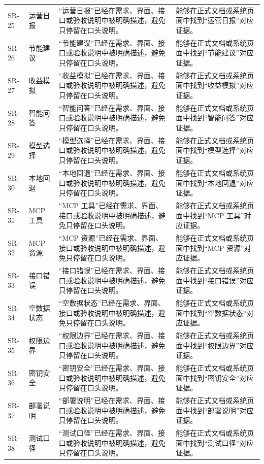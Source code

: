 \documentclass[12pt,a4paper]{ctexart}
\begin{document}
\begin{longtable}{L{1.7cm}L{3.0cm}L{6.2cm}L{4.4cm}}
SR-25 & 运营日报 & “运营日报”已经在需求、界面、接口或验收说明中被明确描述，避免只停留在口头说明。 & 能够在正式文档或系统页面中找到“运营日报”对应证据。 \\
SR-26 & 节能建议 & “节能建议”已经在需求、界面、接口或验收说明中被明确描述，避免只停留在口头说明。 & 能够在正式文档或系统页面中找到“节能建议”对应证据。 \\
SR-27 & 收益模拟 & “收益模拟”已经在需求、界面、接口或验收说明中被明确描述，避免只停留在口头说明。 & 能够在正式文档或系统页面中找到“收益模拟”对应证据。 \\
SR-28 & 智能问答 & “智能问答”已经在需求、界面、接口或验收说明中被明确描述，避免只停留在口头说明。 & 能够在正式文档或系统页面中找到“智能问答”对应证据。 \\
SR-29 & 模型选择 & “模型选择”已经在需求、界面、接口或验收说明中被明确描述，避免只停留在口头说明。 & 能够在正式文档或系统页面中找到“模型选择”对应证据。 \\
SR-30 & 本地回退 & “本地回退”已经在需求、界面、接口或验收说明中被明确描述，避免只停留在口头说明。 & 能够在正式文档或系统页面中找到“本地回退”对应证据。 \\
SR-31 & MCP 工具 & “MCP 工具”已经在需求、界面、接口或验收说明中被明确描述，避免只停留在口头说明。 & 能够在正式文档或系统页面中找到“MCP 工具”对应证据。 \\
SR-32 & MCP 资源 & “MCP 资源”已经在需求、界面、接口或验收说明中被明确描述，避免只停留在口头说明。 & 能够在正式文档或系统页面中找到“MCP 资源”对应证据。 \\
SR-33 & 接口错误 & “接口错误”已经在需求、界面、接口或验收说明中被明确描述，避免只停留在口头说明。 & 能够在正式文档或系统页面中找到“接口错误”对应证据。 \\
SR-34 & 空数据状态 & “空数据状态”已经在需求、界面、接口或验收说明中被明确描述，避免只停留在口头说明。 & 能够在正式文档或系统页面中找到“空数据状态”对应证据。 \\
SR-35 & 权限边界 & “权限边界”已经在需求、界面、接口或验收说明中被明确描述，避免只停留在口头说明。 & 能够在正式文档或系统页面中找到“权限边界”对应证据。 \\
SR-36 & 密钥安全 & “密钥安全”已经在需求、界面、接口或验收说明中被明确描述，避免只停留在口头说明。 & 能够在正式文档或系统页面中找到“密钥安全”对应证据。 \\
SR-37 & 部署说明 & “部署说明”已经在需求、界面、接口或验收说明中被明确描述，避免只停留在口头说明。 & 能够在正式文档或系统页面中找到“部署说明”对应证据。 \\
SR-38 & 测试口径 & “测试口径”已经在需求、界面、接口或验收说明中被明确描述，避免只停留在口头说明。 & 能够在正式文档或系统页面中找到“测试口径”对应证据。 \\

\end{longtable}
\end{document}
